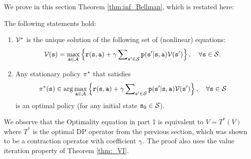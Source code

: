  We prove in this section Theorem \ref{thm:inf_Bellman},
which is restated here:
\begin{theorem*}
The following statements hold:
\begin{enumerate}
  \item $\mathcal{V}_{}^*$ is the unique solution of the following set of (nonlinear) equations:
\begin{equation}\label{eq:Bellman2}
\mathcal{V}({\tt s}) = \mathop {\max }\limits_{{\tt a} \in \mathcal{A}}
\left\{ {{\tt r}({\tt s},{\tt a}) + \gamma \sum\nolimits_{{\tt s}'
\in \mathcal{S}} {{\tt p}({\tt s}'|{\tt s},{\tt a})\mathcal{V}({\tt s}')} } \right\},
\quad \forall {\tt s} \in \mathcal{S}.
\end{equation}
  \item Any stationary policy ${\pi ^*}$ that satisfies
\[{\pi ^*}({\tt s}) \in \arg {\max _{{\tt a}\in \mathcal{A}}}\left\{ {{\tt r}({\tt s},{\tt a}) + \gamma \sum\nolimits_{{\tt s}' \in \mathcal{S}} {{\tt p}({\tt s}'|{\tt s},{\tt a})\mathcal{V}({\tt s}')} } \right\},
\quad \forall {\tt s} \in \mathcal{S}\]
     is an optimal policy (for any initial state ${{\tt s}_0} \in \mathcal{S}$).
\end{enumerate}
\end{theorem*}
We observe that the Optimality equation in part 1 is equivalent to
$V = {T^*}(V)$ where ${T^*}$ is the optimal DP operator from the
previous section, which was shown to be a contraction operator with
coefficient $\gamma $.  The proof also uses the value iteration
property of Theorem \ref{thm:_VI}.

